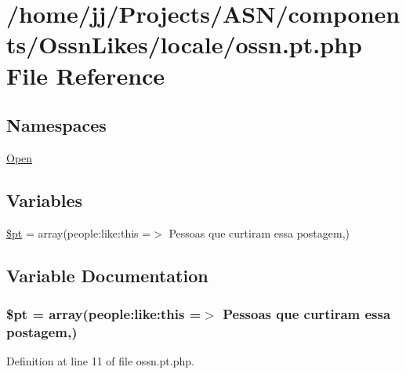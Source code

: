 \hypertarget{components_2_ossn_likes_2locale_2ossn_8pt_8php}{}\section{/home/jj/\+Projects/\+A\+S\+N/components/\+Ossn\+Likes/locale/ossn.pt.\+php File Reference}
\label{components_2_ossn_likes_2locale_2ossn_8pt_8php}
\subsection*{Namespaces}
\begin{DoxyCompactItemize}
\item 
 \hyperlink{namespace_open}{Open}
\end{DoxyCompactItemize}
\subsection*{Variables}
\begin{DoxyCompactItemize}
\item 
\hyperlink{components_2_ossn_likes_2locale_2ossn_8pt_8php_a62c150775a7a00e8663463c638016cad}{\$pt} = array(\textquotesingle{}people\+:like\+:this\textquotesingle{} =$>$ \textquotesingle{}Pessoas que curtiram essa postagem\textquotesingle{},)
\end{DoxyCompactItemize}


\subsection{Variable Documentation}
\subsubsection[{\texorpdfstring{\$pt}{$pt}}]{\setlength{\rightskip}{0pt plus 5cm}\$pt = array(\textquotesingle{}people\+:like\+:this\textquotesingle{} =$>$ \textquotesingle{}Pessoas que curtiram essa postagem\textquotesingle{},)}\hypertarget{components_2_ossn_likes_2locale_2ossn_8pt_8php_a62c150775a7a00e8663463c638016cad}{}\label{components_2_ossn_likes_2locale_2ossn_8pt_8php_a62c150775a7a00e8663463c638016cad}


Definition at line 11 of file ossn.\+pt.\+php.


